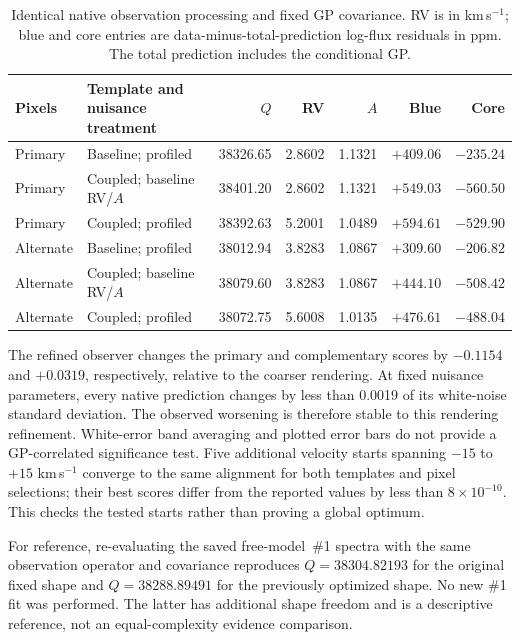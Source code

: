 \begin{table}[htbp]
\centering
\small
\setlength{\tabcolsep}{3pt}
\caption{Identical native observation processing and fixed GP covariance.
RV is in km\,s$^{-1}$; blue and core entries are data-minus-total-prediction
log-flux residuals in ppm. The total prediction includes the conditional GP.}
\label{tab:halpha-fit}
\begin{tabular}{llrrrrr}
\toprule
Pixels & Template and nuisance treatment & $Q$ & RV & $A$ & Blue & Core\\
\midrule
Primary & Baseline; profiled & 38326.65 & 2.8602 & 1.1321 & $+409.06$ & $-235.24$\\
Primary & Coupled; baseline RV/$A$ & 38401.20 & 2.8602 & 1.1321 & $+549.03$ & $-560.50$\\
Primary & Coupled; profiled & 38392.63 & 5.2001 & 1.0489 & $+594.61$ & $-529.90$\\
Alternate & Baseline; profiled & 38012.94 & 3.8283 & 1.0867 & $+309.60$ & $-206.82$\\
Alternate & Coupled; baseline RV/$A$ & 38079.60 & 3.8283 & 1.0867 & $+444.10$ & $-508.42$\\
Alternate & Coupled; profiled & 38072.75 & 5.6008 & 1.0135 & $+476.61$ & $-488.04$\\
\bottomrule
\end{tabular}
\end{table}

The refined observer changes the primary and complementary scores by
$-0.1154$ and $+0.0319$, respectively, relative to the coarser rendering.
At fixed nuisance parameters, every native prediction changes by less than
0.0019 of its white-noise standard deviation. The observed worsening is
therefore stable to this rendering refinement. White-error band averaging
and plotted error bars do not provide a GP-correlated significance test.
Five additional velocity starts spanning $-15$ to $+15$ km\,s$^{-1}$
converge to the same alignment for both templates and pixel selections;
their best scores differ from the reported values by less than
$8\times10^{-10}$. This checks the tested starts rather than proving a
global optimum.

For reference, re-evaluating the saved free-model~\#1 spectra with the same
observation operator and covariance reproduces $Q=38304.82193$ for the
original fixed shape and $Q=38288.89491$ for the previously optimized shape.
No new \#1 fit was performed. The latter has additional shape freedom and
is a descriptive reference, not an equal-complexity evidence comparison.

